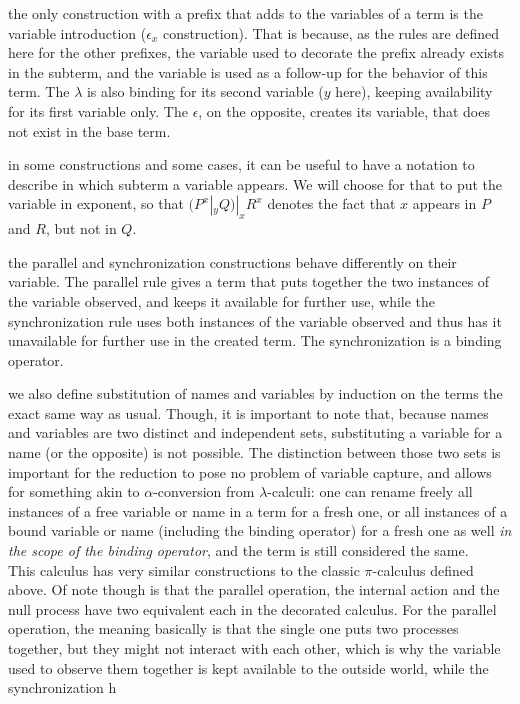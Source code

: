 \remark the only construction with a prefix that adds to the variables of a term is the variable introduction ($\epsilon_x$ construction). That is because, as the rules are defined here for the other prefixes, the variable used to decorate the prefix already exists in the subterm, and the variable is used as a follow-up for the behavior of this term. The $\lambda$ is also binding for its second variable ($y$ here), keeping availability for its first variable only. The $\epsilon$, on the opposite, creates its variable, that does not exist in the base term.

\remark in some constructions and some cases, it can be useful to have a notation to describe in which subterm a variable appears. We will choose for that to put the variable in exponent, so that $(P^x |_y Q) |_x R^x$ denotes the fact that $x$ appears in $P$ and $R$, but not in $Q$.

\remark the parallel and synchronization constructions behave differently on their variable. The parallel rule gives a term that puts together the two instances of the variable observed, and keeps it available for further use, while the synchronization rule uses both instances of the variable observed and thus has it unavailable for further use in the created term. The synchronization is a binding operator.

\remark we also define substitution of names and variables by induction on the terms the exact same way as usual. Though, it is important to note that, because names and variables are two distinct and independent sets, substituting a variable for a name (or the opposite) is not possible. The distinction between those two sets is important for the reduction to pose no problem of variable capture, and allows for something akin to $\alpha$-conversion from $\lambda$-calculi: one can rename freely all instances of a free variable or name in a term for a fresh one, or all instances of a bound variable or name (including the binding operator) for a fresh one as well \emph{in the scope of the binding operator}, and the term is still considered the same.\\

This calculus has very similar constructions to the classic $\pi$-calculus defined above. Of note though is that the parallel operation, the internal action and the null process have two equivalent each in the decorated calculus. For the parallel operation, the meaning basically is that the single one puts two processes together, but they might not interact with each other, which is why the variable used to observe them together is kept available to the outside world, while the synchronization h

